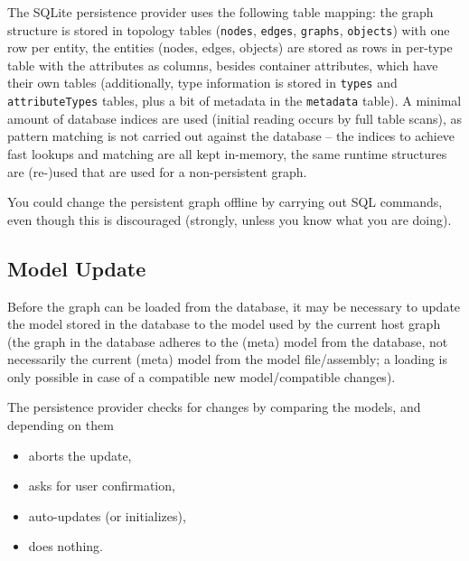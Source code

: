 The SQLite persistence provider uses the following table mapping: the graph structure is stored in topology tables (\texttt{nodes}, \texttt{edges}, \texttt{graphs}, \texttt{objects}) with one row per entity, the entities (nodes, edges, objects) are stored as rows in per-type table with the attributes as columns, besides container attributes, which have their own tables (additionally, type information is stored in \texttt{types} and \texttt{attributeTypes} tables, plus a bit of metadata in the \texttt{metadata} table).
A minimal amount of database indices are used (initial reading occurs by full table scans), as pattern matching is not carried out against the database -- the indices to achieve fast lookups and matching are all kept in-memory, the same runtime structures are (re-)used that are used for a non-persistent graph.

You could change the persistent graph offline by carrying out SQL commands, even though this is discouraged (strongly, unless you know what you are doing).

\subsection{Model Update}\label{sec:modelupdate}

Before the graph can be loaded from the database, it may be necessary to update the model stored in the database to the model used by the current host graph (the graph in the database adheres to the (meta) model from the database, not necessarily the current (meta) model from the model file/assembly; a loading is only possible in case of a compatible new model/compatible changes).

The persistence provider checks for changes by comparing the models, and depending on them
\begin{itemize}
	\item aborts the update,
	\item asks for user confirmation,
	\item auto-updates (or initializes),
	\item does nothing.
\end{itemize}

